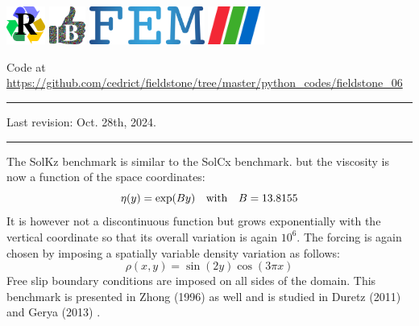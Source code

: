 \noindent
\includegraphics[height=1.25cm]{images/pictograms/replication}
\includegraphics[height=1.25cm]{images/pictograms/benchmark}
\includegraphics[height=1.25cm]{images/pictograms/FEM}
\includegraphics[height=1.25cm]{images/pictograms/paraview}


%

\begin{center}
\inpython
{\small Code at \url{https://github.com/cedrict/fieldstone/tree/master/python_codes/fieldstone_06}}
\end{center}

\par\noindent\rule{\textwidth}{0.4pt}

Last revision: Oct. 28th, 2024.

\par\noindent\rule{\textwidth}{0.4pt}


The SolKz benchmark \cite{repa87} is similar to the SolCx benchmark.
but the viscosity is now a function of the space coordinates: 
\begin{equation}
\eta(y)=\exp(By) \quad {\rm with} \quad B=13.8155
\end{equation}
It is however not a discontinuous function but grows exponentially with the vertical coordinate so that its overall variation is again $10^6$. 
The forcing is again chosen by imposing a spatially variable density variation as follows:
\begin{equation}
\rho(x,y)=\sin(2y) \cos(3\pi x)
\end{equation}
Free slip boundary conditions are imposed on all sides of the domain.
This benchmark is presented in Zhong (1996) \cite{zhon96} as well and is studied 
in Duretz \etal (2011) \cite{dumg11} and Gerya \etal (2013) \cite{gemd13}.

